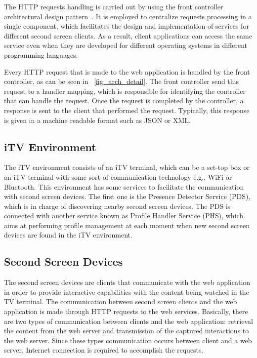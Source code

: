 \documentclass[journal]{IEEEtran}
\begin{document}
The HTTP requests handling is carried out by using the front controller architectural design pattern~\cite{Buschmann2007}. It is employed to centralize requests processing in a single component, which facilitates the design and implementation of services for different second screen clients. As a result, client applications can access the same service even when they are developed for different operating systems in different programming languages.

Every HTTP request that is made to the web application is handled by the front controller, as can be seen in \figurename{~\ref{fig_arch_detail}}. The front controller send this request to a handler mapping, which is responsible for identifying the controller that can handle the request. Once the request is completed by the controller, a response is sent to the client that performed the request. Typically, this response is given in a machine readable format such as JSON or XML.

\subsection{iTV Environment}

The iTV environment consists of an iTV terminal, which can be a set-top box or an iTV terminal with some sort of communication technology e.g., WiFi or Bluetooth. This environment has some services to facilitate the communication with second screen devices. The first one is the Presence Detector Service (PDS), which is in charge of discovering nearby second screen devices. The PDS is connected with another service known as Profile Handler Service (PHS), which aims at performing profile management at each moment when new second screen devices are found in the iTV environment.


\subsection{Second Screen Devices}

The second screen devices are clients that communicate with the web application in order to provide interactive capabilities with the content being watched in the TV terminal. The communication between second screen clients and the web application is made through HTTP requests to the web services. Basically, there are two types of communication between clients and the web application: retrieval the content from the web server and transmission of the captured interactions to the web server. Since these types communication occurs between client and a web server, Internet connection is required to accomplish the requests.
\end{document}
